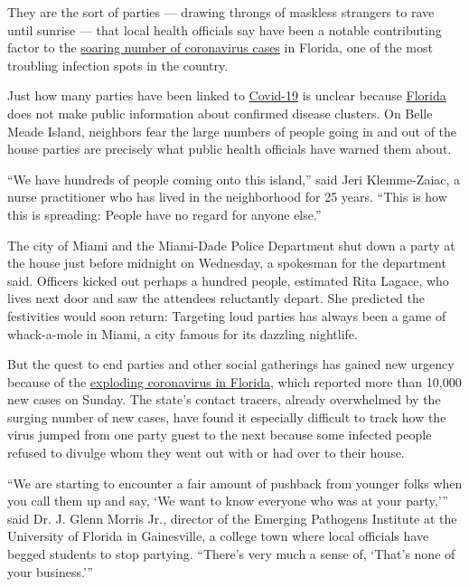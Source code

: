 They are the sort of parties --- drawing throngs of maskless strangers
to rave until sunrise --- that local health officials say have been a
notable contributing factor to the
\href{https://www.nytimes.com/2020/06/28/us/coronavirus-florida-miami.html}{soaring
number of coronavirus cases} in Florida, one of the most troubling
infection spots in the country.

Just how many parties have been linked to
\href{https://www.nytimes.com/2020/07/20/us/coronavirus-florida-elderly.html}{Covid-19}
is unclear because
\href{https://www.nytimes.com/2020/07/20/us/coronavirus-florida-elderly.html}{Florida}
does not make public information about confirmed disease clusters. On
Belle Meade Island, neighbors fear the large numbers of people going in
and out of the house parties are precisely what public health officials
have warned them about.

``We have hundreds of people coming onto this island,'' said Jeri
Klemme-Zaiac, a nurse practitioner who has lived in the neighborhood for
25 years. ``This is how this is spreading: People have no regard for
anyone else.''

The city of Miami and the Miami-Dade Police Department shut down a party
at the house just before midnight on Wednesday, a spokesman for the
department said. Officers kicked out perhaps a hundred people, estimated
Rita Lagace, who lives next door and saw the attendees reluctantly
depart. She predicted the festivities would soon return: Targeting loud
parties has always been a game of whack-a-mole in Miami, a city famous
for its dazzling nightlife.

But the quest to end parties and other social gatherings has gained new
urgency because of the
\href{https://www.nytimes.com/2020/06/26/us/coronavirus-florida-texas-bars-closing.html}{exploding
coronavirus in Florida}, which reported more than 10,000 new cases on
Sunday. The state's contact tracers, already overwhelmed by the surging
number of new cases, have found it especially difficult to track how the
virus jumped from one party guest to the next because some infected
people refused to divulge whom they went out with or had over to their
house.

``We are starting to encounter a fair amount of pushback from younger
folks when you call them up and say, `We want to know everyone who was
at your party,''' said Dr. J. Glenn Morris Jr., director of the Emerging
Pathogens Institute at the University of Florida in Gainesville, a
college town where local officials have begged students to stop
partying. ``There's very much a sense of, `That's none of your
business.'''

